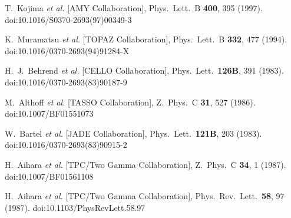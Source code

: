 \documentclass[a4paper,11pt,notoc]{article}
\begin{document}
\begin{thebibliography}{1}
	
	T.~Kojima {\it et al.} [AMY Collaboration],
	Phys.\ Lett.\ B {\bf 400}, 395 (1997).
	doi:10.1016/S0370-2693(97)00349-3
	
	
	K.~Muramatsu {\it et al.} [TOPAZ Collaboration],
	Phys.\ Lett.\ B {\bf 332}, 477 (1994).
	doi:10.1016/0370-2693(94)91284-X
	
	H.~J.~Behrend {\it et al.} [CELLO Collaboration],
	Phys.\ Lett.\  {\bf 126B}, 391 (1983).
	doi:10.1016/0370-2693(83)90187-9
	
	M.~Althoff {\it et al.} [TASSO Collaboration],
	Z.\ Phys.\ C {\bf 31}, 527 (1986).
	doi:10.1007/BF01551073
	
	W.~Bartel {\it et al.} [JADE Collaboration],
	Phys.\ Lett.\  {\bf 121B}, 203 (1983).
	doi:10.1016/0370-2693(83)90915-2
	
	
	
	H.~Aihara {\it et al.} [TPC/Two Gamma Collaboration],
	Z.\ Phys.\ C {\bf 34}, 1 (1987).
	doi:10.1007/BF01561108
	
	
	H.~Aihara {\it et al.} [TPC/Two Gamma Collaboration],
	Phys.\ Rev.\ Lett.\  {\bf 58}, 97 (1987).
	doi:10.1103/PhysRevLett.58.97
	

\end{thebibliography}
\end{document}
